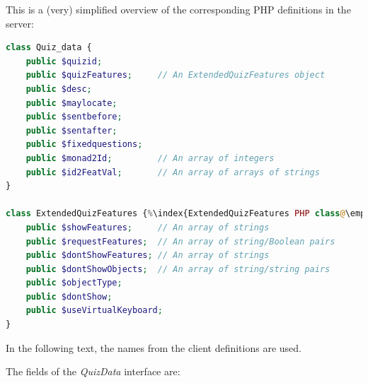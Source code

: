 \documentclass[11pt,oneside,a4paper]{memoir}
\begin{document}
This is a (very) simplified overview of the corresponding PHP definitions in the server:

\begin{lstlisting}[language=PHP]
class Quiz_data {
    public $quizid;
    public $quizFeatures;     // An ExtendedQuizFeatures object
    public $desc;
    public $maylocate;
    public $sentbefore;
    public $sentafter;
    public $fixedquestions;
    public $monad2Id;         // An array of integers
    public $id2FeatVal;       // An array of arrays of strings
}

class ExtendedQuizFeatures {%\index{ExtendedQuizFeatures PHP class@\emph{ExtendedQuizFeatures} PHP class}%
    public $showFeatures;     // An array of strings
    public $requestFeatures;  // An array of string/Boolean pairs
    public $dontShowFeatures; // An array of strings
    public $dontShowObjects;  // An array of string/string pairs
    public $objectType;
    public $dontShow;
    public $useVirtualKeyboard;
}
\end{lstlisting}

In the following text, the names from the client definitions are used.

The fields of the \emph{QuizData} interface are:
\end{document}
